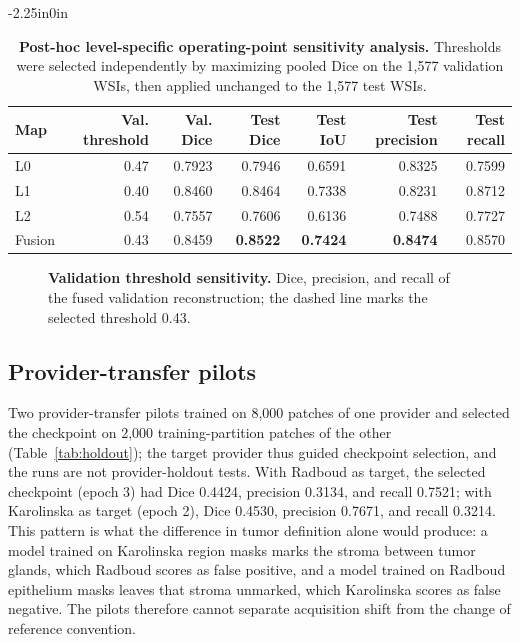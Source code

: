 \documentclass[10pt,letterpaper]{article}
\begin{document}
\begin{table}[H]\begin{adjustwidth}{-2.25in}{0in}\centering
\caption{\textbf{Post-hoc level-specific operating-point sensitivity analysis.} Thresholds were selected independently by maximizing pooled Dice on the 1,577 validation WSIs, then applied unchanged to the 1,577 test WSIs.}
\begin{tabular}{lrrrrrr}\toprule
Map & Val. threshold & Val. Dice & Test Dice & Test IoU & Test precision & Test recall\\\midrule
L0 & 0.47 & 0.7923 & 0.7946 & 0.6591 & 0.8325 & 0.7599\\
L1 & 0.40 & 0.8460 & 0.8464 & 0.7338 & 0.8231 & 0.8712\\
L2 & 0.54 & 0.7557 & 0.7606 & 0.6136 & 0.7488 & 0.7727\\
Fusion & 0.43 & 0.8459 & \textbf{0.8522} & \textbf{0.7424} & \textbf{0.8474} & 0.8570\\\bottomrule
\end{tabular}\label{tab:thr_sens}\end{adjustwidth}\end{table}

\begin{figure}[H]
\centering
\caption{\textbf{Validation threshold sensitivity.} Dice, precision, and recall of the fused validation reconstruction; the dashed line marks the selected threshold 0.43.}
\label{fig:thr}
\end{figure}

\subsection*{Provider-transfer pilots}
Two provider-transfer pilots trained on 8,000 patches of one provider and selected the checkpoint on 2,000 training-partition patches of the other (Table~\ref{tab:holdout}); the target provider thus guided checkpoint selection, and the runs are not provider-holdout tests. With Radboud as target, the selected checkpoint (epoch 3) had Dice 0.4424, precision 0.3134, and recall 0.7521; with Karolinska as target (epoch 2), Dice 0.4530, precision 0.7671, and recall 0.3214. This pattern is what the difference in tumor definition alone would produce: a model trained on Karolinska region masks marks the stroma between tumor glands, which Radboud scores as false positive, and a model trained on Radboud epithelium masks leaves that stroma unmarked, which Karolinska scores as false negative. The pilots therefore cannot separate acquisition shift from the change of reference convention.
\end{document}
